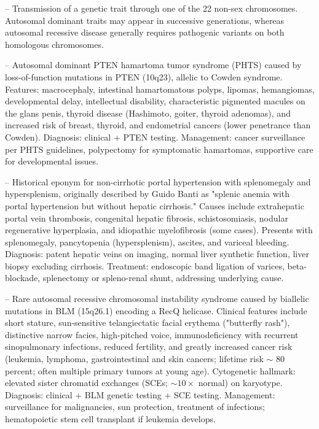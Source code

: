 -- Transmission of a genetic trait through one of the 22 non-sex chromosomes. Autosomal dominant traits may appear in successive generations, whereas autosomal recessive disease generally requires pathogenic variants on both homologous chromosomes.

-- Autosomal dominant PTEN hamartoma tumor syndrome (PHTS) caused by loss-of-function mutations in PTEN (10q23), allelic to Cowden syndrome. Features: macrocephaly, intestinal hamartomatous polyps, lipomas, hemangiomas, developmental delay, intellectual disability, characteristic pigmented macules on the glans penis, thyroid disease (Hashimoto, goiter, thyroid adenomas), and increased risk of breast, thyroid, and endometrial cancers (lower penetrance than Cowden). Diagnosis: clinical + PTEN testing. Management: cancer surveillance per PHTS guidelines, polypectomy for symptomatic hamartomas, supportive care for developmental issues.

-- Historical eponym for non-cirrhotic portal hypertension with splenomegaly and hypersplenism, originally described by Guido Banti as "splenic anemia with portal hypertension but without hepatic cirrhosis." Causes include extrahepatic portal vein thrombosis, congenital hepatic fibrosis, schistosomiasis, nodular regenerative hyperplasia, and idiopathic myelofibrosis (some cases). Presents with splenomegaly, pancytopenia (hypersplenism), ascites, and variceal bleeding. Diagnosis: patent hepatic veins on imaging, normal liver synthetic function, liver biopsy excluding cirrhosis. Treatment: endoscopic band ligation of varices, beta-blockade, splenectomy or spleno-renal shunt, addressing underlying cause.

-- Rare autosomal recessive chromosomal instability syndrome caused by biallelic mutations in BLM (15q26.1) encoding a RecQ helicase. Clinical features include short stature, sun-sensitive telangiectatic facial erythema ("butterfly rash"), distinctive narrow facies, high-pitched voice, immunodeficiency with recurrent sinopulmonary infections, reduced fertility, and greatly increased cancer risk (leukemia, lymphoma, gastrointestinal and skin cancers; lifetime risk $\sim$ 80 percent; often multiple primary tumors at young age). Cytogenetic hallmark: elevated sister chromatid exchanges (SCEs; $\sim 10\times$ normal) on karyotype. Diagnosis: clinical + BLM genetic testing + SCE testing. Management: surveillance for malignancies, sun protection, treatment of infections; hematopoietic stem cell transplant if leukemia develops.

